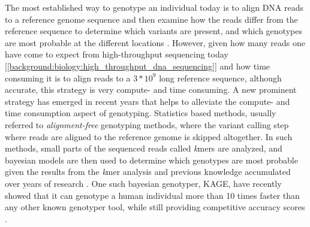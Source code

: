 The most established way to genotype an individual today is to align DNA reads to a reference genome sequence and then examine how the reads differ from the reference sequence to determine which variants are present, and which genotypes are most probable at the different locations \cite{gatk}.
However, given how many reads one have come to expect from high-throughput sequencing today [\ref{background:biology:high_throughput_dna_sequencing}] and how time consuming it is to align reads to a $3*10^9$ long reference sequence, although accurate, this strategy is very compute- and time consuming.
A new prominent strategy has emerged in recent years that helps to alleviate the compute- and time consumption aspect of genotyping.
Statistics based methods, usually referred to \textit{alignment-free} genotyping methods, where the variant calling step where reads are aligned to the reference genome is skipped altogether. 
In such methods, small parts of the sequenced reads called \textit{k}mers are analyzed, and bayesian models are then used to determine which genotypes are most probable given the results from the \textit{k}mer analysis and previous knowledge accumulated over years of research \cite{kage,malva,1000_genomes_project}.
One such bayesian genotyper, KAGE, have recently showed that it can genotype a human individual more than 10 times faster than any other known genotyper tool, while still providing competitive accuracy scores \cite{kage}.
